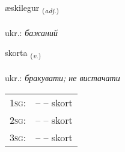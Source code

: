 \documentclass[frontgrid, backgrid]{flacards}\usepackage[]{graphicx}\usepackage[]{xcolor}
\begin{document}
\renewcommand{\flhead}{\vskip5pt \fboxsep=0pt {\small\bfseries\footnotesize Lýsingarorð | прикметник}}
\renewcommand{\fcfoot}{\vskip5pt \fboxsep=0pt \hspace{2pt}{\small\bfseries\footnotesize 2K}}

\renewcommand{\blhead}{\vskip5pt {\small\bfseries\footnotesize Lýsingarorð | прикметник }}
\renewcommand{\bcfoot}{\vskip5pt \hspace{2pt}{\small\bfseries\footnotesize 2K}}


{æskilegur \small{\textsubscript{(\textit{adj.})}} \\[1ex] %
\textphonetic{[aiscɪlɛɣʏr]} \\
ukr.: \emph{бажаний} \\  [2ex]
\renewcommand*{\arraystretch}{0.8}
}

\renewcommand{\flhead}{\vskip5pt \fboxsep=0pt {\small\bfseries\footnotesize Sagnorð | дієслово}}
\renewcommand{\fcfoot}{\vskip5pt \fboxsep=0pt \hspace{2pt}{\small\bfseries\footnotesize 2K}}

\renewcommand{\blhead}{\vskip5pt {\small\bfseries\footnotesize Sagnorð | дієслово }}
\renewcommand{\bcfoot}{\vskip5pt \hspace{2pt}{\small\bfseries\footnotesize 2K}}


{skorta \small{\textsubscript{(\textit{v.})}} \\[1ex] %
\textphonetic{[skɔr̥ta]} \\
ukr.: \emph{бракувати; не вистачати} \\  [2ex]
\renewcommand*{\arraystretch}{0.8}
\begin{tabular}{p{1cm}l}
\textsc{1sg}: &  --  -- skort \\ 
\textsc{2sg}: &  --  -- skort \\ 
\textsc{3sg}: &  --  -- skort \\ 
\end{tabular}
}
\end{document}
